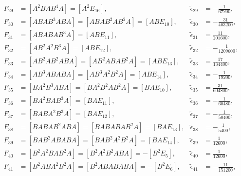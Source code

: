 \documentclass[12pt]{article}
\begin{document}
\begin{equation}
  \begin{aligned}
    \nonumber
    F_{29} &= \left [ A^{2} B A B^{4} A \right ] = \left [ A^{2} E_{16} \right ], & \tilde{\epsilon}_{29} &= - \frac{1}{67 200}, \\
    F_{30} &= \left [ A B A B^{3} A B A \right ] = \left [ A B A B^{2} A B^{2} A \right ] = \left [ A B E_{10} \right ], & \tilde{\epsilon}_{30} &= - \frac{31}{403 200}, \\
    F_{31} &= \left [ A B A B A B^{3} A \right ] = \left [ A B E_{11} \right ], & \tilde{\epsilon}_{31} &= \frac{11}{201 600}, \\
    F_{32} &= \left [ A B^{2} A^{2} B^{3} A \right ] = \left [ A B E_{12} \right ], & \tilde{\epsilon}_{32} &= - \frac{1}{1 209 600}, \\
    F_{33} &= \left [ A B^{2} A B^{2} A B A \right ] = \left [ A B^{2} A B A B^{2} A \right ] = \left [ A B E_{13} \right ], & \tilde{\epsilon}_{33} &= \frac{17}{134 400}, \\
    F_{34} &= \left [ A B^{3} A B A B A \right ] = \left [ A B^{3} A^{2} B^{2} A \right ] = \left [ A B E_{14} \right ], & \tilde{\epsilon}_{34} &= - \frac{1}{19 200}, \\
    F_{35} &= \left [ B A^{2} B^{3} A B A \right ] = \left [ B A^{2} B^{2} A B^{2} A \right ] = \left [ B A E_{10} \right ], & \tilde{\epsilon}_{35} &= \frac{31}{604 800}, \\
    F_{36} &= \left [ B A^{2} B A B^{3} A \right ] = \left [ B A E_{11} \right ], & \tilde{\epsilon}_{36} &= - \frac{1}{60 480}, \\
    F_{37} &= \left [ B A B A^{2} B^{3} A \right ] = \left [ B A E_{12} \right ], & \tilde{\epsilon}_{37} &= - \frac{1}{50 400}, \\
    F_{38} &= \left [ B A B A B^{2} A B A \right ] = \left [ B A B A B A B^{2} A \right ] = \left [ B A E_{13} \right ], & \tilde{\epsilon}_{38} &= - \frac{1}{5400}, \\
    F_{39} &= \left [ B A B^{2} A B A B A \right ] = \left [ B A B^{2} A^{2} B^{2} A \right ] = \left [ B A E_{14} \right ], & \tilde{\epsilon}_{39} &= \frac{1}{12 600}, \\
    F_{40} &= \left [ B^{2} A^{2} B A B^{2} A \right ] = \left [ B^{2} A^{2} B^{2} A B A \right ] = - \left [ B^{2} E_{5} \right ], & \tilde{\epsilon}_{40} &= \frac{1}{12 600}, \\
    F_{41} &= \left [ B^{2} A B A^{2} B^{2} A \right ] = \left [ B^{2} A B A B A B A \right ] = - \left [ B^{2} E_{6} \right ], & \tilde{\epsilon}_{41} &= - \frac{11}{151 200}, \\

\end{aligned}
\end{equation}
\end{document}
